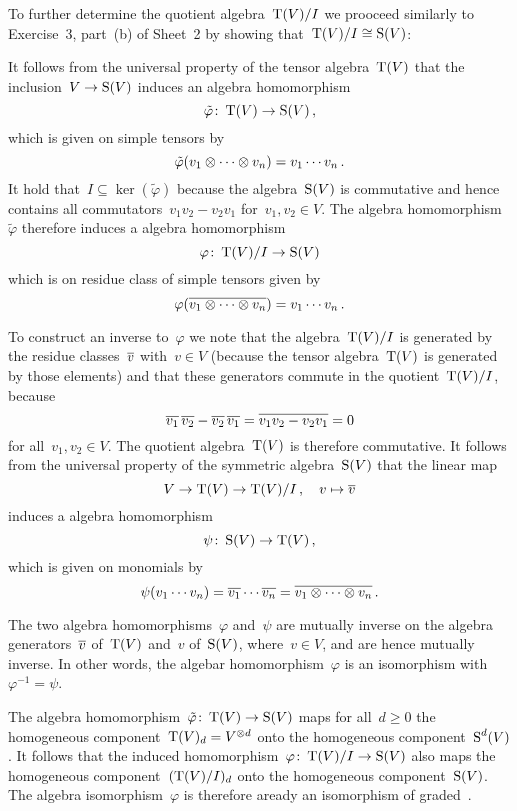 To further determine the quotient algebra~$\operatorname{T}(V)/I$ we prooceed similarly to Exercise~3, part~(b) of Sheet~2 by showing that~$\operatorname{T}(V)/I \cong \operatorname{S}(V)$:

It follows from the universal property of the tensor algebra~$\operatorname{T}(V)$ that the inclusion~$V \to \operatorname{S}(V)$ induces an algebra homomorphism
\[
          \tilde{\varphi}
  \colon  \operatorname{T}(V)
  \to     \operatorname{S}(V) \,,
\]
which is given on simple tensors by
\[
    \tilde{\varphi}(v_1 \otimes \dotsb \otimes v_n)
  = v_1 \dotsm v_n \,.
\]
It hold that~$I \subseteq \ker(\tilde{\varphi})$ because the algebra~$\operatorname{S}(V)$ is commutative and hence contains all commutators~$v_1 v_2 - v_2 v_1$ for~$v_1, v_2 \in V$.
The algebra homomorphism~$\tilde{\varphi}$ therefore induces a {\welldef} algebra homomorphism
\[
          \varphi
  \colon  \operatorname{T}(V)/I
  \to     \operatorname{S}(V)
\]
which is on residue class of simple tensors given by
\[
    \varphi( \overline{v_1 \otimes \dotsb \otimes v_n} )
  = v_1 \dotsm v_n \,.
\]

To construct an inverse to~$\varphi$ we note that the algebra~$\operatorname{T}(V)/I$ is generated by the residue classes~$\overline{v}$ with~$v \in V$ (because the tensor algebra~$\operatorname{T}(V)$ is generated by those elements) and that these generators commute in the quotient~$\operatorname{T}(V)/I$, because
\[
    \overline{v_1} \, \overline{v_2} - \overline{v_2} \, \overline{v_1}
  = \overline{v_1 v_2 - v_2 v_1}
  = 0
\]
for all~$v_1, v_2 \in V$.
The quotient algebra~$\operatorname{T}(V)$ is therefore commutative.
It follows from the universal property of the symmetric algebra~$\operatorname{S}(V)$ that the linear map
\[
          V
  \to     \operatorname{T}(V)
  \to     \operatorname{T}(V)/I \,,
  \quad   v
  \mapsto \overline{v}
\]
induces a {\welldef} algebra homomorphism
\[
          \psi
  \colon  \operatorname{S}(V)
  \to     \operatorname{T}(V) \,,
\]
which is given on monomials by
\[
    \psi( v_1 \dotsm v_n )
  = \overline{v_1} \dotsm \overline{v_n}
  = \overline{v_1 \otimes \dotsb \otimes v_n} \,.
\]

The two algebra homomorphisms~$\varphi$ and~$\psi$ are mutually inverse on the algebra generators~$\overline{v}$ of~$\operatorname{T}(V)$ and~$v$ of~$\operatorname{S}(V)$, where~$v \in V$, and are hence mutually inverse.
In other words, the algebar homomorphism~$\varphi$ is an isomorphism with~$\varphi^{-1} = \psi$.

The algebra homomorphism~$\tilde{\varphi} \colon \operatorname{T}(V) \to \operatorname{S}(V)$ maps for all~$d \geq 0$ the homogeneous component~$\operatorname{T}(V)_d = V^{\otimes d}$ onto the homogeneous component~$\operatorname{S}^d(V)$.
It follows that the induced homomorphism~$\varphi \colon \operatorname{T}(V)/I \to \operatorname{S}(V)$ also maps the homogeneous component~$(\operatorname{T}(V)/I)_d$ onto the homogeneous component~$\operatorname{S}(V)$.
The algebra isomorphism~$\varphi$ is therefore aready an isomorphism of graded~{\kalgs}.

